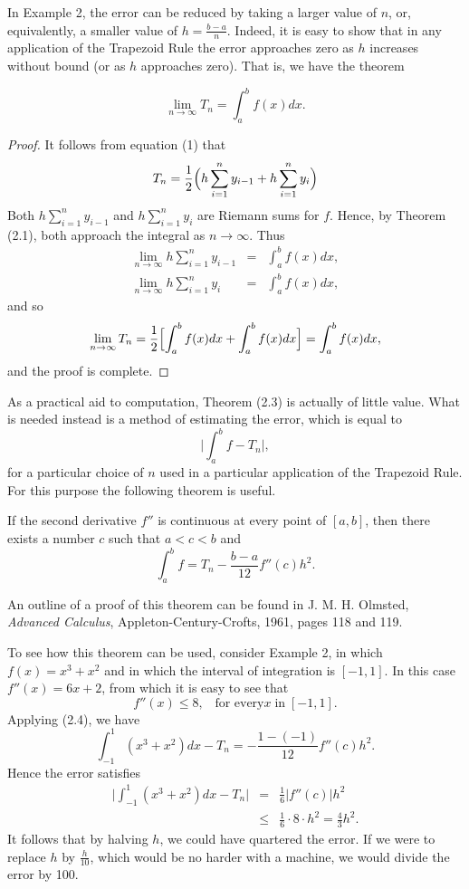 In Example 2, the error can be reduced by taking a larger value of $n$, or, equivalently, a smaller value of $h = \frac{b - a}{n}$. Indeed, it is easy to show that in any application of the Trapezoid Rule the error approaches zero as $h$ increases without bound (or as $h$ approaches zero). That is, we have the theorem

\begin{theorem} %
$$ 
\lim_{n \rightarrow \infty} T_n = \int_a^b f(x) dx .
$$
\end{theorem}

\begin{proof}
It follows from equation (1) that
$$
T_n = \frac{1}{2} \Bigl( h \sum_{i = 1}^{n} y_{i - 1} + h \sum_{i = 1}^{n} y_i \Bigr)
$$
Both $h \sum_{i = 1}^{n} y_{i - 1}$ and $h \sum_{i = 1}^{n} y_i$ are Riemann sums for $f$. Hence, by Theorem (2.1), both approach the integral as $n \rightarrow \infty$. Thus
\begin{eqnarray*}
\lim_{n \rightarrow \infty} h \sum_{i = 1}^{n} y_{i - 1} &=& \int_a^b f(x) dx,\\
\lim_{n \rightarrow \infty} h \sum_{i = 1}^{n} y_{i} &=& \int_a^b f(x) dx,
\end{eqnarray*}
and so 
$$
\lim_{n \rightarrow \infty} T_n = \frac{1}{2} \Bigl[ \int_a^b f(x) dx + \int_a^b f(x) dx \Bigr] = \int_a^b f(x)dx, 
$$
and the proof is complete.
\end{proof}

As a practical aid to computation, Theorem (2.3) is actually of little value. What is needed instead is a method of estimating the error, which is equal to
$$
\big| \int_a^b f - T_n \big|,
$$
\noindent for a particular choice of $n$ used in a particular application of the Trapezoid Rule. For this purpose the following theorem is useful.

\begin{theorem} %
If the second derivative $f''$ is continuous at every point of $[a, b]$, then there exists a number $c$ such that $a < c < b$ and
$$
\int_a^b f = T_n -\frac{b -a}{12} f''(c)h^2.
$$
\end{theorem}

An outline of a proof of this theorem can be found in J. M. H. Olmsted, \textit{Advanced Calculus}, Appleton-Century-Crofts, 1961, pages 118 and 119.

To see how this theorem can be used, consider Example 2, in which $f(x) = x^3 + x^2$ and in which the interval of integration is $[-1, 1]$. In this case $f''(x) = 6x + 2$, from which it is easy to see that
$$
f''(x) \leq 8, \;\;\;\mbox{for every} x\; \mbox{in}\; [-1, 1].
$$
\noindent Applying (2.4), we have
$$
\int_{-1}^{1} (x^3 + x^2) dx - T_n = - \frac{1 - (-1)}{12} f''(c)h^2.
$$
\noindent Hence the error satisfies
\begin{eqnarray*}
\big| \int_{-1}^{1} (x^3 + x^2) dx - T_n \big| 
&=& \frac{1}{6} | f''(c) | h^2 \\
&\leq& \frac{1}{6} \cdot 8 \cdot h^2 = \frac{4}{3}h^2.
\end{eqnarray*}
\noindent It follows that by halving $h$, we could have quartered the error. If we were to replace $h$ by $\frac{h}{10}$, which would be no harder with a machine, we would divide the error by 100.
